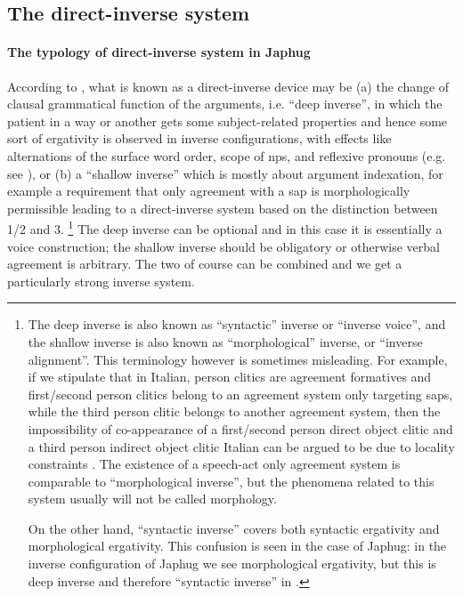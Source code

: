 \documentclass[a4paper, oneside, 12pt]{report}
\begin{document}
\subsection{The direct-inverse system}\label{sec:grammatical.clause.direct-inverse}

\paragraph*{The typology of direct-inverse system in Japhug}
According to \citet{oxford2023tale},
what is known as a direct-inverse device may be 
(a) the change of clausal grammatical function of the arguments,
i.e. ``deep inverse'', in which the patient in a way or another gets some subject-related properties 
and hence some sort of ergativity is observed in inverse configurations,
with effects like alternations of the surface word order,
scope of \ac{np}s, and reflexive pronouns (e.g. see \citealt{bruening2005algonquian}), or
(b) a ``shallow inverse'' which is mostly about argument indexation, 
for example a requirement that only agreement with a \ac{sap} 
is morphologically permissible
leading to a direct-inverse system based on the distinction between 1/2 and 3.%
\footnote{
    The deep inverse is also known as ``syntactic'' inverse or ``inverse voice'',
    and the shallow inverse is also known as ``morphological'' inverse, or ``inverse alignment''.
    This terminology however is sometimes misleading.
    For example, if we stipulate that in Italian,
    person clitics are agreement formatives
    and first/second person clitics belong to an agreement system only targeting \ac{sap}s,
    while the third person clitic belongs to another agreement system,
    then the impossibility of co-appearance of a first/second person direct object clitic 
    and a third person indirect object clitic Italian 
    can be argued to be due to locality constraints
    \citep{bianchi2006syntax}.
    The existence of a speech-act only agreement system is comparable to ``morphological inverse'',
    but the phenomena related to this system usually will not be called morphology.

    On the other hand, ``syntactic inverse'' covers both syntactic ergativity and morphological ergativity.
    This confusion is seen in the case of Japhug:
    in the inverse configuration of Japhug we see morphological ergativity,
    but this is deep inverse and therefore ``syntactic inverse'' in \citet{oxford2023tale}.
}
The deep inverse can be optional and in this case it is essentially a voice construction;
the shallow inverse should be obligatory or otherwise verbal agreement is arbitrary.
The two of course can be combined and we get a particularly strong inverse system.
\end{document}

